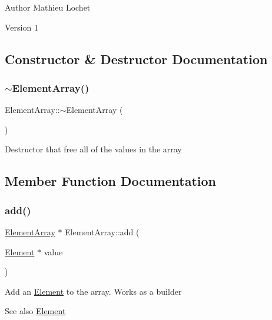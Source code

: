 \begin{DoxyAuthor}{Author}
Mathieu Lochet 
\end{DoxyAuthor}
\begin{DoxyVersion}{Version}
1 
\end{DoxyVersion}


\subsection{Constructor \& Destructor Documentation}
\mbox{\label{classElementArray_a30d544b599922612d29e48a0cc0e3305}} 
\subsubsection{\texorpdfstring{$\sim$\+Element\+Array()}{~ElementArray()}}
{\footnotesize\ttfamily Element\+Array\+::$\sim$\+Element\+Array (\begin{DoxyParamCaption}{ }\end{DoxyParamCaption})\hspace{0.3cm}{\ttfamily [override]}}

Destructor that free all of the values in the array 

\subsection{Member Function Documentation}
\mbox{\label{classElementArray_aff62f7af32e8440015b8dd297749b6c6}} 
\subsubsection{\texorpdfstring{add()}{add()}}
{\footnotesize\ttfamily \mbox{\hyperlink{classElementArray}{Element\+Array}} $\ast$ Element\+Array\+::add (\begin{DoxyParamCaption}\item[{\mbox{\hyperlink{classElement}{Element}} $\ast$}]{value }\end{DoxyParamCaption})}

Add an \mbox{\hyperlink{classElement}{Element}} to the array. Works as a builder \begin{DoxySeeAlso}{See also}
\mbox{\hyperlink{classElement}{Element}}
\end{DoxySeeAlso}

